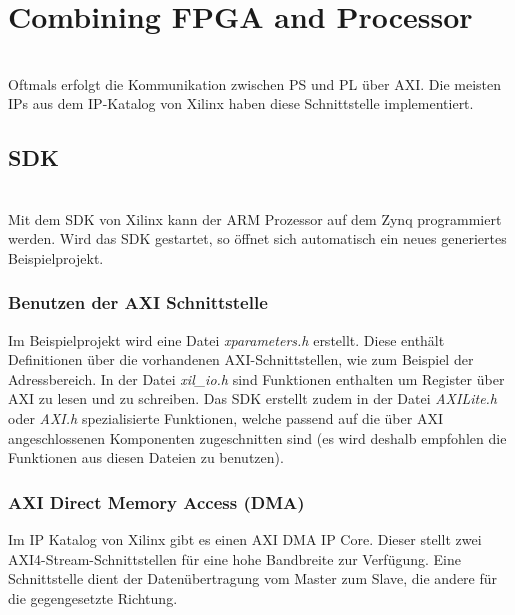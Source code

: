 \section{Combining FPGA and Processor}$~$ \\
Oftmals erfolgt die Kommunikation zwischen PS und PL über AXI. Die meisten IPs aus dem IP-Katalog von Xilinx haben diese Schnittstelle implementiert.

\subsection{SDK}$~$ \\
Mit dem SDK von Xilinx kann der ARM Prozessor auf dem Zynq programmiert werden. Wird das SDK gestartet, so öffnet sich automatisch ein neues generiertes Beispielprojekt.

\subsubsection{Benutzen der AXI Schnittstelle}
Im Beispielprojekt wird eine Datei \textit{xparameters.h} erstellt. Diese enthält Definitionen über die vorhandenen AXI-Schnittstellen, wie zum Beispiel der Adressbereich. In der Datei \textit{xil\_io.h} sind Funktionen enthalten um Register über AXI zu lesen und zu schreiben. Das SDK erstellt zudem in der Datei \textit{AXILite.h} oder \textit{AXI.h} spezialisierte Funktionen, welche passend auf die über AXI angeschlossenen Komponenten zugeschnitten sind (es wird deshalb empfohlen die Funktionen aus diesen Dateien zu benutzen).


\subsubsection{AXI Direct Memory Access (DMA)}
Im IP Katalog von Xilinx gibt es einen AXI DMA IP Core. Dieser stellt zwei AXI4-Stream-Schnittstellen für eine hohe Bandbreite zur Verfügung. Eine Schnittstelle dient der Datenübertragung vom Master zum Slave, die andere für die gegengesetzte Richtung.

